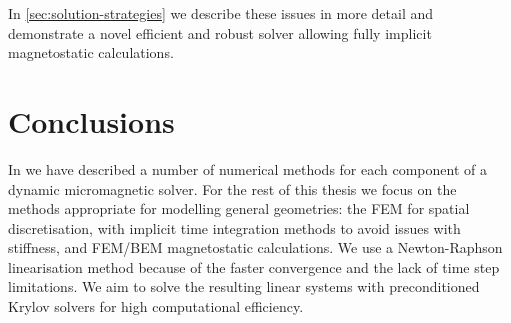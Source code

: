 In \cref{sec:solution-strategies} we describe these issues in more detail and demonstrate a novel efficient and robust solver allowing fully implicit magnetostatic calculations.


\section{Conclusions}
\label{sec:num-meth-conclusions}

In  we have described a number of numerical methods for each component of a dynamic micromagnetic solver.
For the rest of this thesis we focus on the methods appropriate for modelling general geometries: the FEM for spatial discretisation, with implicit time integration methods to avoid issues with stiffness, and FEM/BEM magnetostatic calculations.
We use a Newton-Raphson linearisation method because of the faster convergence and the lack of time step limitations.
We aim to solve the resulting linear systems with preconditioned Krylov solvers for high computational efficiency.

